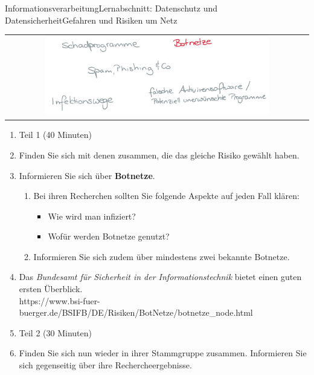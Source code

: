 \documentclass[oneside,openany,headings=optiontotoc,11pt,numbers=noenddot]{scrreprt}
\begin{document}
\begin{worksheet}{Informationsverarbeitung}{Lernabschnitt: Datenschutz und Datensicherheit}{Gefahren und Risiken um Netz}
		\newpage
		\setcounter{page}{1}
		\begin{framed}
			\begin{tabular}{lcr}
				& \includegraphics[width=0.8\textwidth]{../99_Bilder/Botnetze.jpg} & \\
			\end{tabular}
		\end{framed}
		\begin{enumerate}[label=(\Roman*.)]
			\item[] \color{gray}Teil 1 (40 Minuten)\normalcolor
			\item Finden Sie sich mit denen zusammen, die das gleiche Risiko gewählt haben.
			\item Informieren Sie sich über \textbf{Botnetze}.
			\begin{enumerate}
				\item[] Bei ihren Recherchen sollten Sie folgende Aspekte auf jeden Fall klären:
				\begin{itemize}[label=+]
					\item Wie wird man infiziert?
					\item Wofür werden Botnetze genutzt?
				\end{itemize}
				\item[] Informieren Sie sich zudem über mindestens zwei bekannte Botnetze.
			\end{enumerate}
			\item[] Das \textit{Bundesamt für Sicherheit in der Informationstechnik} bietet einen guten ersten Überblick.\\
			\small{\color{codegray}https://www.bsi-fuer-buerger.de/BSIFB/DE/Risiken/BotNetze/botnetze\_node.html}\normalsize\\
			\item[] \color{gray}Teil 2 (30 Minuten)\normalcolor
			\item Finden Sie sich nun wieder in ihrer Stammgruppe zusammen. Informieren Sie sich gegenseitig über ihre Rechercheergebnisse.
		\end{enumerate}
	

\end{worksheet}
\end{document}
